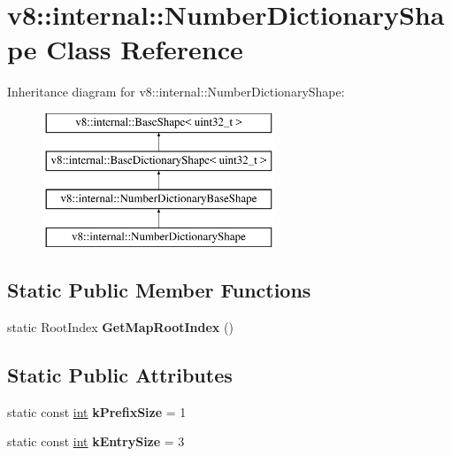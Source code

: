 \hypertarget{classv8_1_1internal_1_1NumberDictionaryShape}{}\section{v8\+:\+:internal\+:\+:Number\+Dictionary\+Shape Class Reference}
\label{classv8_1_1internal_1_1NumberDictionaryShape}
Inheritance diagram for v8\+:\+:internal\+:\+:Number\+Dictionary\+Shape\+:\begin{figure}[H]
\begin{center}
\leavevmode
\includegraphics[height=4.000000cm]{classv8_1_1internal_1_1NumberDictionaryShape}
\end{center}
\end{figure}
\subsection*{Static Public Member Functions}
\begin{DoxyCompactItemize}
\item 
\mbox{\label{classv8_1_1internal_1_1NumberDictionaryShape_a2fec93543f1bd2345510c17ce6add5c3}} 
static Root\+Index {\bfseries Get\+Map\+Root\+Index} ()
\end{DoxyCompactItemize}
\subsection*{Static Public Attributes}
\begin{DoxyCompactItemize}
\item 
\mbox{\label{classv8_1_1internal_1_1NumberDictionaryShape_a9cc2fbb97baf89b44cf2abf3a29c25e3}} 
static const \mbox{\hyperlink{classint}{int}} {\bfseries k\+Prefix\+Size} = 1
\item 
\mbox{\label{classv8_1_1internal_1_1NumberDictionaryShape_a9076ec00745caf9bf124186dff62ea96}} 
static const \mbox{\hyperlink{classint}{int}} {\bfseries k\+Entry\+Size} = 3
\end{DoxyCompactItemize}
